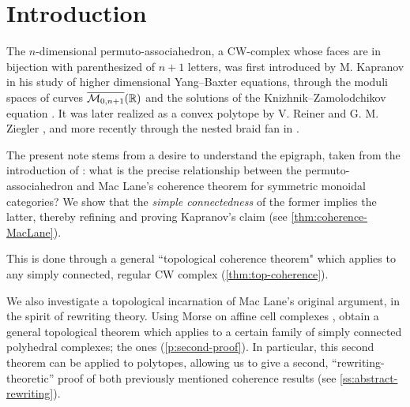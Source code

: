 
\section*{Introduction} 
\label{s:introduction}

The $n$-dimensional permuto-associahedron, a CW-complex whose faces are in bijection with parenthesized  of $n+1$ letters, was first introduced by M. Kapranov in his study of higher dimensional Yang--Baxter equations, through the moduli spaces of curves $\overline{\mathcal{M}_{0,n+1}}(\mathbb R)$ and the solutions of the Knizhnik--Zamolodchikov equation \cite{kapranov1993}.
It was later realized as a convex polytope by V. Reiner and G. M. Ziegler \cite{reinerCoxeterassociahedra1994}, and more recently through the nested braid fan in \cite{CastilloLiu21}.

The present note stems from a desire to understand the epigraph, taken from the introduction of \cite{kapranov1993}: what is the precise relationship between the permuto-associahedron and Mac Lane's coherence theorem for symmetric monoidal categories? 
We show that the \emph{simple connectedness} of the former implies the latter, thereby refining and proving Kapranov's claim (see \cref{thm:coherence-MacLane}).

This is done through a general ``topological coherence theorem" which applies to any simply connected, regular CW complex (\cref{thm:top-coherence}).

We also investigate a topological incarnation of Mac Lane's original argument, in the spirit of rewriting theory. 
Using Morse  on affine cell complexes \cite{bestvinaMorseTheoryFiniteness1997},  obtain a general topological theorem which applies to a certain family of simply connected polyhedral complexes; the ones  (\cref{p:second-proof}). 
In particular, this second theorem can be applied to polytopes, allowing us to give a second, ``rewriting-theoretic'' proof of both previously mentioned coherence results (see \cref{ss:abstract-rewriting}). 

